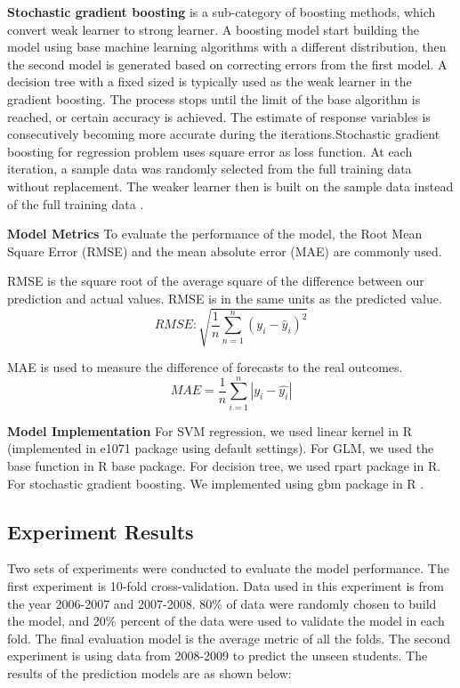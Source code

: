 \documentclass[12pt,english]{report}
\begin{document}
\vspace{0.15in}
\noindent \textbf{Stochastic gradient boosting} is a sub-category of boosting methods, which convert weak learner to strong learner. A boosting model start building the model using base machine learning algorithms with a different distribution, then the second model is generated based on correcting errors from the first model. A decision tree with a fixed sized is typically used as the weak learner in the gradient boosting. The process stops until the limit of the base algorithm is reached, or certain accuracy is achieved. The estimate of response variables is consecutively becoming more accurate during the iterations.Stochastic gradient boosting for regression problem uses square error as loss function. At each iteration, a sample data was randomly selected from the full training data without replacement. The weaker learner then is built on the sample data instead of the full training data \citep{FRIEDMAN2002367}. 

\vspace{0.15in}
\noindent \textbf{Model Metrics} To evaluate the performance of the model, the Root Mean Square Error (RMSE)  and the mean absolute error (MAE) are commonly used. 

RMSE is the square root of the average square of the difference between our prediction and actual values. RMSE is in the same units as the predicted value.
\begin{equation}
RMSE:  \sqrt{\frac{1}{n}\sum_{n=1}^n (y_i-\hat{y}_i)^2}
\end{equation}

MAE is used to measure the difference of forecasts to the real outcomes.
\begin{equation}
MAE = \frac{1}{n}\sum_{i=1}^n \left| y_i - \hat{y_i}\right| 
\end{equation}

\vspace{0.15in}
\textbf{Model Implementation} For SVM regression, we used linear kernel in R (implemented in e1071 package \citep{e1071} using default settings). For GLM, we used the base function in R base package. For decision tree, we used rpart package \citep{rpart} in R. For stochastic gradient boosting. We implemented using gbm package in R \citep{gbm}.

\subsection{Experiment Results}
Two sets of experiments were conducted to evaluate the model performance. The first experiment is 10-fold cross-validation. Data used in this experiment is from the year 2006-2007 and 2007-2008.  80\% of data were randomly chosen to build the model, and 20\% percent of the data were used to validate the model in each fold. The final evaluation model is the average metric of all the folds. The second experiment is using data from 2008-2009 to predict the unseen students.  The results of the prediction models are as shown below:
\end{document}
